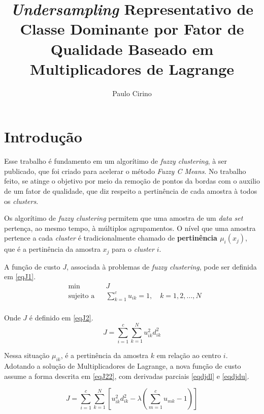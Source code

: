\documentclass[]{article}
\title{\textit{Undersampling} Representativo de Classe Dominante por Fator de Qualidade Baseado em Multiplicadores de Lagrange  }
\author{Paulo Cirino}
\begin{document}
	
	\maketitle
	
	\begin{abstract}
		
	\end{abstract}
	
	\section{Introdução}
	
	Esse trabalho é fundamento em um algorítimo de \textit{fuzzy clustering}, à ser publicado, que foi criado para acelerar o método \textit{Fuzzy C Means}. No trabalho feito, se atinge o objetivo por meio da remoção de pontos da bordas com o auxilio de um fator de qualidade, que diz respeito a pertinência de cada amostra à todos os \textit{clusters}.
	
	Os algorítimo de  \textit{fuzzy clustering } permitem que uma amostra de um \textit{data set} pertença, ao mesmo tempo, à múltiplos agrupamentos. O nível que uma amostra pertence a cada \textit{cluster} é tradicionalmente chamado de \textbf{pertinência $\mu_{i}(x_j)$}, que é a pertinência da amostra $x_j$ para o \textit{cluster} $i$.
	
	A função de custo $J$, associada à problemas de \textit{fuzzy clustering}, pode ser definida em 
	\ref{eqJ1}.
	\begin{equation}
	\label{eqJ1}
	\begin{aligned}
	& {\text{min}}
	& & J \\
	& \text{sujeito a}
	& & \sum_{k=1}^c u_{ik}=1,   \quad k=1,2,...,N \\
	\end{aligned}
	\end{equation}
	
	Onde $J$ é definido em \ref{eqJ2}.
	\begin{equation}
	\label{eqJ2}
	J = \sum_{i=1}^c \sum_{k=1}^N u_{ik}^2 d_{ik}^2
	\end{equation} 
	
	Nessa situação $\mu_{ik}$, é a pertinência da amostra $k$ em relação ao centro $i$. Adotando a solução de Multiplicadores de Lagrange, a nova função de custo assume a forma descrita em \ref{eqJ22}, com derivadas parciais \ref{eqdjdl} e \ref{eqdjdu}. 
	
	\begin{equation}
	\label{eqJ22}
	J = \sum_{i=1}^c \sum_{k=1}^N \left [  u_{ik}^2 d_{ik}^2 - \lambda (\sum_{m=1}^c u_{mk}-1)\right]
	\end{equation}
	
\end{document}
